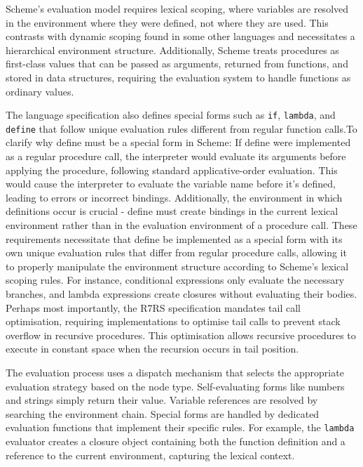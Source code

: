 \documentclass[final]{cmpreport_02}
\begin{document}
Scheme's evaluation model requires lexical scoping, where variables are resolved in the environment where they were defined, not where they are used. This contrasts with dynamic scoping found in some other languages and necessitates a hierarchical environment structure. Additionally, Scheme treats procedures as first-class values that can be passed as arguments, returned from functions, and stored in data structures, requiring the evaluation system to handle functions as ordinary values.

The language specification also defines special forms such as \texttt{if}, \texttt{lambda}, and \texttt{define} that follow unique evaluation rules different from regular function calls.To clarify why define must be a special form in Scheme: If define were implemented as a regular procedure call, the interpreter would evaluate its arguments before applying the procedure, following standard applicative-order evaluation. This would cause the interpreter to evaluate the variable name before it's defined, leading to errors or incorrect bindings. Additionally, the environment in which definitions occur is crucial - define must create bindings in the current lexical environment rather than in the evaluation environment of a procedure call. These requirements necessitate that define be implemented as a special form with its own unique evaluation rules that differ from regular procedure calls, allowing it to properly manipulate the environment structure according to Scheme's lexical scoping rules. For instance, conditional expressions only evaluate the necessary branches, and lambda expressions create closures without evaluating their bodies. Perhaps most importantly, the R7RS specification mandates tail call optimisation, requiring implementations to optimise tail calls to prevent stack overflow in recursive procedures. This optimisation allows recursive procedures to execute in constant space when the recursion occurs in tail position.

The evaluation process uses a dispatch mechanism that selects the appropriate evaluation strategy based on the node type. Self-evaluating forms like numbers and strings simply return their value. Variable references are resolved by searching the environment chain. Special forms are handled by dedicated evaluation functions that implement their specific rules. For example, the \texttt{lambda} evaluator creates a closure object containing both the function definition and a reference to the current environment, capturing the lexical context.
\end{document}
